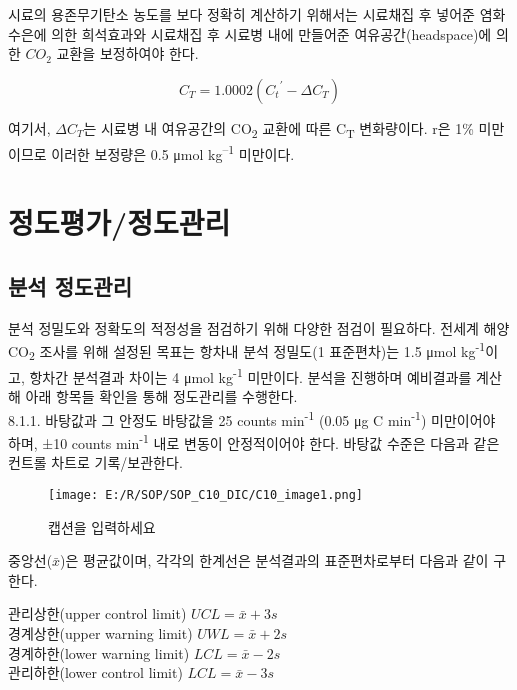 \documentclass[
]{book}
\begin{document}
시료의 용존무기탄소 농도를 보다 정확히 계산하기 위해서는 시료채집 후 넣어준 염화수은에 의한 희석효과와 시료채집 후 시료병 내에 만들어준 여유공간(headspace)에 의한 \(CO_2\) 교환을 보정하여야 한다.

\[C_T=1.0002({C_t}^{'} - \Delta C_T)\]

여기서, \(\Delta C_T\)는 시료병 내 여유공간의 CO\textsubscript{2} 교환에 따른 C\textsubscript{T} 변화량이다. r은 1\% 미만이므로 이러한 보정량은 0.5 μmol kg\textsuperscript{--1} 미만이다.

\hypertarget{uxc815uxb3c4uxd3c9uxac00uxc815uxb3c4uxad00uxb9ac}{%
\section{정도평가/정도관리}\label{uxc815uxb3c4uxd3c9uxac00uxc815uxb3c4uxad00uxb9ac}}

\hypertarget{uxbd84uxc11d-uxc815uxb3c4uxad00uxb9ac}{%
\subsection{분석 정도관리}\label{uxbd84uxc11d-uxc815uxb3c4uxad00uxb9ac}}

분석 정밀도와 정확도의 적정성을 점검하기 위해 다양한 점검이 필요하다. 전세계 해양 CO\textsubscript{2} 조사를 위해 설정된 목표는 항차내 분석 정밀도(1 표준편차)는 1.5 μmol kg\textsuperscript{-1}이고, 항차간 분석결과 차이는 4 μmol kg\textsuperscript{-1} 미만이다.
분석을 진행하며 예비결과를 계산해 아래 항목들 확인을 통해 정도관리를 수행한다.\\
8.1.1. 바탕값과 그 안정도
바탕값을 25 counts min\textsuperscript{-1} (0.05 μg C min\textsuperscript{-1}) 미만이어야 하며, ±10 counts min\textsuperscript{-1} 내로 변동이 안정적이어야 한다. 바탕값 수준은 다음과 같은 컨트롤 차트로 기록/보관한다.

\begin{figure}
\centering
\texttt{[image: E:/R/SOP/SOP\_C10\_DIC/C10\_image1.png]}
\caption{캡션을 입력하세요}
\end{figure}

중앙선(\(\bar{x}\))은 평균값이며, 각각의 한계선은 분석결과의 표준편차로부터 다음과 같이 구한다.

관리상한(upper control limit) \(UCL=\bar{x}+3s\)\\
경계상한(upper warning limit) \(UWL=\bar{x}+2s\)\\
경계하한(lower warning limit) \(LCL=\bar{x}-2s\)\\
관리하한(lower control limit) \(LCL=\bar{x}-3s\)
\end{document}
